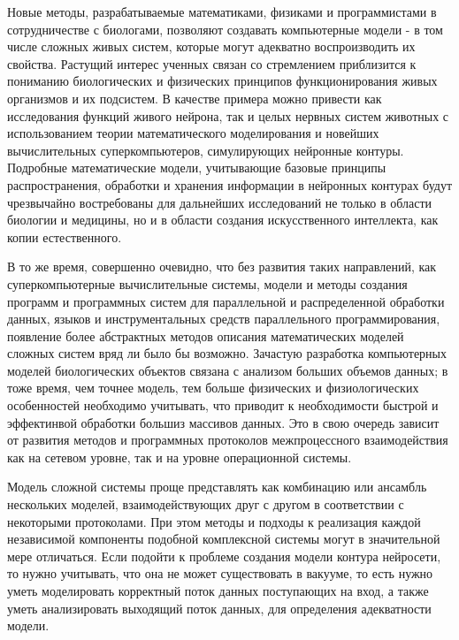 Новые методы, разрабатываемые математиками, физиками и программистами в сотрудничестве с биологами, позволяют создавать компьютерные модели - в том числе сложных живых систем, которые могут адекватно воспроизводить их свойства. Растущий интерес ученных связан со стремлением приблизится к пониманию биологических и физических принципов функционирования живых организмов и их подсистем. В качестве примера можно привести как исследования функций живого нейрона, так и целых нервных систем животных с использованием теории математического моделирования и новейших вычислительных суперкомпьютеров, симулирующих нейронные контуры. Подробные математические модели, учитывающие базовые принципы распространения, обработки и хранения информации в нейронных контурах будут чрезвычайно востребованы для дальнейших исследований не только в области биологии и медицины, но и в области создания искусственного интеллекта, как копии естественного. 

В то же время, совершенно очевидно, что без развития таких направлений, как  суперкомпьютерные вычислительные системы, модели и методы создания программ и программных систем для параллельной и распределенной обработки данных, языков и инструментальных средств параллельного программирования, появление более абстрактных методов описания математических моделей сложных систем вряд ли было бы возможно. Зачастую разработка компьютерных моделей биологических объектов связана с анализом больших объемов данных; в тоже время, чем точнее модель, тем больше физических и физиологических особенностей необходимо учитывать, что приводит к необходимости быстрой и эффектинвой обработки большиз массивов данных. Это в свою очередь зависит от развития методов и программных протоколов межпроцессного взаимодействия как на сетевом уровне, так и на уровне операционной системы.

{\actuality} Модель сложной системы проще представлять как комбинацию или ансамбль нескольких моделей, взаимодействующих друг с другом в соответствии с некоторыми протоколами. При этом методы и подходы к реализация каждой независимой компоненты подобной комплексной системы могут в значительной мере отличаться. Если подойти к проблеме создания модели контура нейросети, то нужно учитывать, что она не может существовать в вакууме, то есть нужно уметь моделировать корректный поток данных поступающих на вход, а также уметь анализировать выходящий поток данных, для определения адекватности модели.


